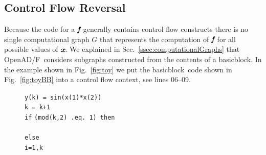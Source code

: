 \documentclass[11pt]{article}
\newcommand{\basicblock}{basicblock}
\newcommand{\OpenADF}{OpenAD/F}
\newcommand{\bmf}{\mbox{\bf\em f}}
\newcommand{\bmx}{\mbox{\bf\em x}}
\newcommand{\refsec}[1]{{Sec.~\ref{#1}}}
\newcommand{\reffig}[1]{{Fig.~\ref{#1}}}
\begin{document}
\subsection{Control Flow Reversal} \label{ssec:cfReversal}
Because the code for a $\bmf$ generally contains control flow constructs there is no 
single  computational graph 
$G$ that represents the computation of $\bmf$ for all possible values of $\bmx$.
We explained in \refsec{ssec:computationalGraphs} that \OpenADF\ considers subgraphs constructed 
from the contents of a \basicblock.
In the example shown in \reffig{fig:toy} we put the \basicblock\ code shown in 
\reffig{fig:toyBB} into a control flow context, see lines 06--09.
\begin{figure}
  \begin{center}
    \begin{minipage}{.5\textwidth}
      \begin{tabbing}
        \hspace{.6cm}{\footnotesize \bf 00}\hspace{.5cm} {\tt y(k) = sin(x(1)*x(2))} \\
        \hspace{.6cm}{\footnotesize \bf 01}\hspace{.5cm} {\tt k    = k+1} \\
        \hspace{.6cm}{\footnotesize \bf 02}\hspace{.5cm} {\tt if} \={\tt (mod(k,2) .eq. 1) then } \\
        \hspace{.6cm}{\footnotesize \bf 03}\hspace{.5cm}   \\
        \hspace{.6cm}{\footnotesize \bf 04}\hspace{.5cm} {\tt else } \\
        \hspace{.6cm}{\footnotesize \bf 05}\hspace{.5cm}  \={\tt i=1,k } \\
        \hspace{.6cm}{\footnotesize \bf 06}\hspace{.5cm} \> \\
        \hspace{.6cm}{\footnotesize \bf 07}\hspace{.5cm} \> \\
        \hspace{.6cm}{\footnotesize \bf 08}\hspace{.5cm} \> \\

\end{tabbing}
\end{minipage}
\end{center}
\end{figure}
\end{document}
